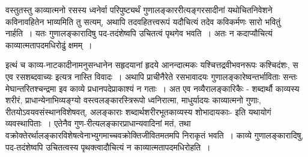 {वस्तुतस्तु काव्यात्मनो रसस्य ध्वनेर्वा परिपुष्ट्यर्थं गुणालङ्काररीत्यङ्गरसादीनां यथोचितनिवेशने कविनावहितेन भाव्यमिति तु सत्यम्, अथापि तदवहितत्त्वरूपं यदौचित्यं तदेव कविकर्मणः सारो भवितुं नार्हति~। यतः गुणालङ्कारादिषु पद-तदंशेष्वपि उचितत्वं पृथगेव भवति~। अतः न कदाप्यौचित्यं काव्यात्मतापदमधिरोढुं क्षमम्~। 

इत्थं च काव्य-नाटकादीनामनुसन्धानेन सहृदयानां हृदये आनन्दात्मकः यश्चित्तद्र\-\break वीभवनरूपः कश्चिदंशः, स एव रसशब्दवाच्यः इत्यत्र नास्ति विवादः~। अथापि प्राचीनै\-रेते  रसभावादयः गुणालङ्कारेष्वन्तर्भाविताः सन्तः मेघान्तरितश्चन्द्रमा  इव काव्ये प्रधानपदे\break प्राकाश्यं न गताः~। अत एव नव्यैरालङ्कारिकैः  - शब्दार्थौ काव्यस्य शरीरं, प्राधान्येना\-भिव्यङ्ग्यो वस्त्वलङ्कारस्त्रिरूपो ध्वनिरात्मा, माधुर्यादयः काव्यात्मनो गुणाः, रीतयोऽवयवसंस्थानविशेषवत्, अलङ्काराः शब्दार्थशरीरभूतकाव्यस्य शोभादायकाः- इति यथायोगं व्यवस्थापिताः~। एतेनैव गुण-रीत्यलङ्कारप्राधान्यवादिनां मतं, तथा वक्रोक्तेरर्थालङ्कारविशेषत्वेनाभ्युगमाच्च\break वक्रोक्तिजीवितमतमपि निराकृतं भवति~। काव्ये गुणालङ्कारादिषु, पद-तदंशेष्वपि उचितत्वस्य पृथक्त्वादौचित्यं न काव्यात्मतापदमधिरोहति~। 

\articleend
}
